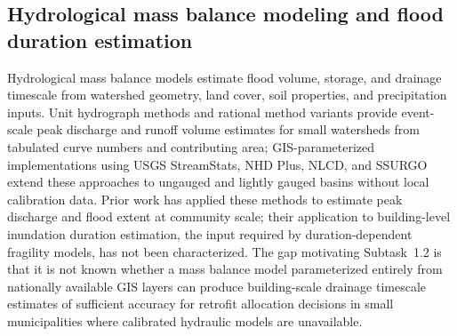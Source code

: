 \documentclass[11pt]{article}
\begin{document}
\subsection{Hydrological mass balance modeling and flood duration estimation}
Hydrological mass balance models estimate flood volume, storage, and drainage
timescale from watershed geometry, land cover, soil properties, and precipitation
inputs.
Unit hydrograph methods and rational method variants provide event-scale peak
discharge and runoff volume estimates for small watersheds from tabulated curve
numbers and contributing area; GIS-parameterized implementations using USGS
StreamStats, NHD Plus, NLCD, and SSURGO extend these approaches to ungauged
and lightly gauged basins without local calibration data.
Prior work has applied these methods to estimate peak discharge and flood extent
at community scale; their application to building-level inundation duration
estimation, the input required by duration-dependent fragility models, has not
been characterized.
The gap motivating Subtask~1.2 is that it is not known whether a mass balance
model parameterized entirely from nationally available GIS layers can produce
building-scale drainage timescale estimates of sufficient accuracy for retrofit
allocation decisions in small municipalities where calibrated hydraulic models
are unavailable.
\end{document}

